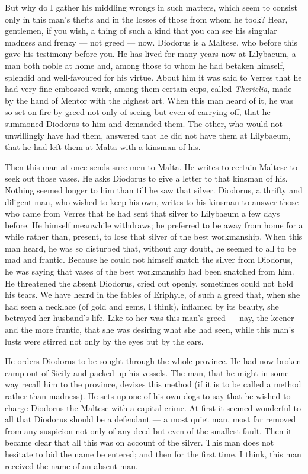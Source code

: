  But why do I gather his middling wrongs in such matters, which seem to consist only in this man's thefts and in the losses of those from whom he took? Hear, gentlemen, if you wish, a thing of such a kind that you can see his singular madness and frenzy --- not greed --- now. Diodorus is a Maltese, who before this gave his testimony before you. He has lived for many years now at Lilybaeum, a man both noble at home and, among those to whom he had betaken himself, splendid and well-favoured for his virtue. About him it was said to Verres that he had very fine embossed work, among them certain cups, called \textit{Thericlia}, made by the hand of Mentor with the highest art. When this man heard of it, he was so set on fire by greed not only of seeing but even of carrying off, that he summoned Diodorus to him and demanded them. The other, who would not unwillingly have had them, answered that he did not have them at Lilybaeum, that he had left them at Malta with a kinsman of his.

 Then this man at once sends sure men to Malta. He writes to certain Maltese to seek out those vases. He asks Diodorus to give a letter to that kinsman of his. Nothing seemed longer to him than till he saw that silver. Diodorus, a thrifty and diligent man, who wished to keep his own, writes to his kinsman to answer those who came from Verres that he had sent that silver to Lilybaeum a few days before. He himself meanwhile withdraws; he preferred to be away from home for a while rather than, present, to lose that silver of the best workmanship. When this man heard, he was so disturbed that, without any doubt, he seemed to all to be mad and frantic. Because he could not himself snatch the silver from Diodorus, he was saying that vases of the best workmanship had been snatched from him. He threatened the absent Diodorus, cried out openly, sometimes could not hold his tears. We have heard in the fables of Eriphyle, of such a greed that, when she had seen a necklace (of gold and gems, I think), inflamed by its beauty, she betrayed her husband's life. Like to her was this man's greed --- nay, the keener and the more frantic, that she was desiring what she had seen, while this man's lusts were stirred not only by the eyes but by the ears.

 He orders Diodorus to be sought through the whole province. He had now broken camp out of Sicily and packed up his vessels. The man, that he might in some way recall him to the province, devises this method (if it is to be called a method rather than madness). He sets up one of his own dogs to say that he wished to charge Diodorus the Maltese with a capital crime. At first it seemed wonderful to all that Diodorus should be a defendant --- a most quiet man, most far removed from any suspicion not only of any deed but even of the smallest fault. Then it became clear that all this was on account of the silver. This man does not hesitate to bid the name be entered; and then for the first time, I think, this man received the name of an absent man.

